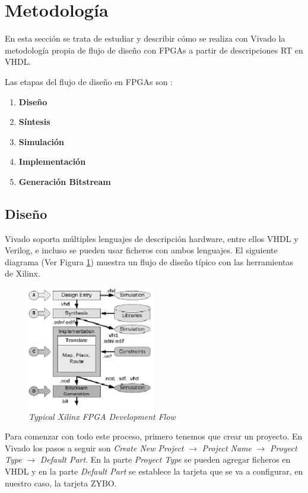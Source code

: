 \section{Metodología}

En esta sección se trata de estudiar y describir cómo se realiza con Vivado la metodología propia de flujo de diseño con FPGAs a partir de
descripciones RT en VHDL.

Las etapas del flujo de diseño en FPGAs son \cite{smith2010fpgas}:

\begin{enumerate}
    \item \textbf{Diseño}
    \item \textbf{Síntesis}
    \item \textbf{Simulación}
    \item \textbf{Implementación}
    \item \textbf{Generación Bitstream}
\end{enumerate}

\subsection{Diseño}

Vivado soporta múltiples lenguajes de descripción hardware, entre ellos VHDL y Verilog, e incluso se pueden usar ficheros con ambos lenguajes. 
El siguiente diagrama (Ver Figura \ref{Dflow}) muestra un flujo de diseño típico con las herramientas de Xilinx.

\begin{figure}[H]
    \centering
    \includegraphics[width = 0.5\textwidth]{imagenes/flujo.png}
    \caption{\textit{Typical Xilinx FPGA Development Flow}}\label{Dflow}
\end{figure}

Para comenzar con todo este proceso, primero tenemos que crear un proyecto. En Vivado los pasos a seguir son \textit{Create New Project} 
$\rightarrow$ \textit{Project Name} $\rightarrow$ \textit{Proyect Type} $\rightarrow$ \textit{Default Part}. En la parte \textit{Proyect Type} 
se pueden agregar ficheros en VHDL y en la parte \textit{Default Part} se establece la tarjeta que se va a configurar, en nuestro caso, 
la tarjeta ZYBO. 

